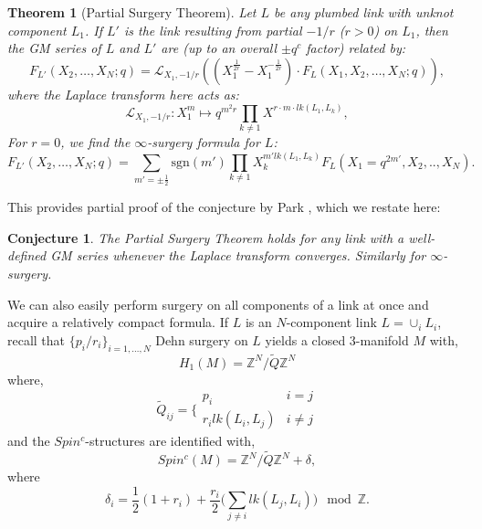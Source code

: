 \documentclass{article}
\newcommand{\Z}{{\mathbb Z}}
\newtheorem{theorem}{Theorem}
\newtheorem{conjecture}{Conjecture}
\numberwithin{corollary}{theorem}
\numberwithin{corollary}{proposition}
\begin{document}
\begin{theorem}[Partial Surgery Theorem] \label{partialsurgerytheorem}  Let $L$ be any plumbed link with unknot component $L_1$. If $L'$ is the link resulting from partial $-1/r$ ($r>0$) on $L_1$, then the GM series of $L$ and $L'$ are (up to an overall $\pm q^c$ factor) related by:
$$F_{L'}(X_2,\ldots,X_N;q) = \mathcal{L}_{X_1,-1/r}\left((X_1^{\frac{1}{2r}} - X_1^{-\frac{1}{2r}})\cdot F_L(X_1,X_2,\ldots,X_N;q)\right),$$
where the Laplace transform here acts as:
$$\mathcal{L}_{X_1,-1/r}: X_1^m \mapsto q^{m^2 r}\prod_{k\neq 1} X^{r\cdot  m \cdot lk(L_1,L_k)}, $$
For $r=0$, we find the $\infty$-surgery formula for $L$:
$$F_{L'}(X_2,\ldots,X_N;q) = \sum_{m'=\pm \frac{1}{2}}  \mathrm{sgn}(m') \prod_{k\neq 1} X^{m' lk(L_1,L_k)}_k  F_L(X_1 = q^{2m'},X_2,..,X_N). $$
\end{theorem}

This provides partial proof of the conjecture by Park \cite{S1}, which we restate here:
\begin{conjecture} \label{partial_surg_conj} The Partial Surgery Theorem holds for any link with a well-defined GM series whenever the Laplace transform converges. Similarly for $\infty$-surgery. 
\end{conjecture}

We can also easily perform surgery on all components of a link at once and acquire a relatively compact formula. If $L$ is an $N$-component link $L = \cup_i L_i$,  recall that $\{p_i/r_i\}_{i=1,\ldots,N}$ Dehn surgery on $L$ yields a closed 3-manifold $M$ with,
$$H_1(M) = \Z^N/\tilde{Q}\Z^N$$
where,
$$\tilde{Q}_{ij} = \biggl\{ \begin{matrix}
    p_i &i=j\\
    r_i lk(L_i,L_j) & i\neq j
\end{matrix}$$
and the $Spin^c$-structures are identified with,
$$Spin^c(M) = \Z^N/\tilde{Q}\Z^N +\delta,$$
where
$$\delta_i = \frac{1}{2}(1+r_i)+\frac{r_i}{2} \biggl(\sum_{j\neq i}lk(L_j,L_i)\biggr) \mod \Z . $$
\end{document}
